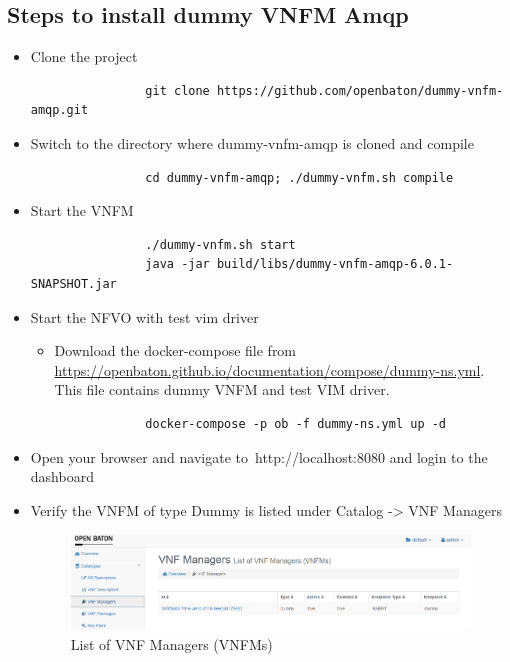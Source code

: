 			\subsection*{Steps to install dummy VNFM Amqp}
			\begin{itemize}
				
				\item Clone the project
				\begin{lstlisting}
				git clone https://github.com/openbaton/dummy-vnfm-amqp.git 
				\end{lstlisting}
				
				\item Switch to the directory where dummy-vnfm-amqp is cloned and compile
				\begin{lstlisting}
				cd dummy-vnfm-amqp; ./dummy-vnfm.sh compile
				\end{lstlisting}
				
				\item Start the VNFM
				\begin{lstlisting}
				./dummy-vnfm.sh start
				java -jar build/libs/dummy-vnfm-amqp-6.0.1-SNAPSHOT.jar
				\end{lstlisting}
				
				\item Start the NFVO with test vim driver
				\begin{itemize}
					\item Download the docker-compose file from \hyperlink{name}{https://openbaton.github.io/documentation/compose/dummy-ns.yml}. This file contains dummy VNFM and test VIM driver.
				\end{itemize}
				\begin{lstlisting}
				docker-compose -p ob -f dummy-ns.yml up -d
				\end{lstlisting}
				
				\item Open your browser and navigate to http://localhost:8080 and login to the dashboard
				\item Verify the VNFM of type Dummy is listed under Catalog -> VNF Managers
				\begin{figure} [h]
					\centering
					\includegraphics[width=0.7\linewidth]{figures/VNFMList}
					\caption{List of VNF Managers (VNFMs)}
					\label{fig:VNFMList}
				\end{figure}
			\end{itemize}
			
